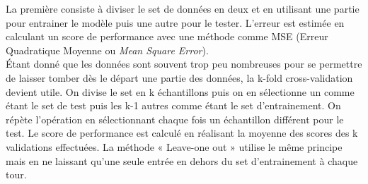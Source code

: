 \noindent La première consiste à diviser le set de données en deux et en utilisant une partie pour entrainer le modèle puis une autre pour le tester. L'erreur est estimée en calculant un score de performance avec une méthode comme MSE (Erreur Quadratique Moyenne ou \textit{Mean Square Error}). \\

\noindent Étant donné que les données sont souvent trop peu nombreuses pour se permettre de laisser tomber dès le départ une partie des données, la k-fold cross-validation devient utile. On divise le set en k échantillons puis on en sélectionne un comme étant le set de test puis les k-1 autres comme étant le set d'entrainement. On répète l'opération en sélectionnant chaque fois un échantillon différent pour le test. Le score de performance est calculé en réalisant la moyenne des scores des k validations effectuées. La méthode « Leave-one out » utilise le même principe mais en ne laissant qu'une seule entrée en dehors du set d'entrainement à chaque tour\cite{hastie_09_elements-of.statistical-learning}. 


